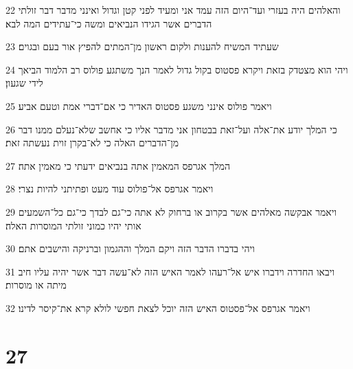 \par 22 והאלהים היה בעזרי ועד־היום הזה עמד אני ומעיד לפני קטן וגדול ואינני מדבר דבר זולתי הדברים אשר הגידו הנביאים ומשה כי־עתידים המה לבא׃
\par 23 שעתיד המשיח להענות ולקום ראשון מן־המתים להפיץ אור בעם ובגוים׃
\par 24 ויהי הוא מצטדק בזאת ויקרא פסטוס בקול גדול לאמר הנך משתגע פולוס רב הלמוד הביאך לידי שגעון׃
\par 25 ויאמר פולוס אינני משגע פסטוס האדיר כי אם־דברי אמת וטעם אביע׃
\par 26 כי המלך יודע את־אלה ועל־זאת בבטחון אני מדבר אליו כי אחשב שלא־נעלם ממנו דבר מן־הדברים האלה כי לא־בקרן זוית נעשתה זאת׃
\par 27 המלך אגרפס המאמין אתה בנביאים ידעתי כי מאמין אתה׃
\par 28 ויאמר אגרפס אל־פולוס עוד מעט ופתיתני להיות נצרי׃
\par 29 ויאמר אבקשה מאלהים אשר בקרוב או ברחוק לא אתה כי־גם לבדך כי־גם כל־השמעים אותי יהיו כמוני זולתי המוסרות האלה׃
\par 30 ויהי בדברו הדבר הזה ויקם המלך וההגמון וברניקה והישבים אתם׃
\par 31 ויבאו החדרה וידברו איש אל־רעהו לאמר האיש הזה לא־עשה דבר אשר יהיה עליו חיב מיתה או מוסרות׃
\par 32 ויאמר אגרפס אל־פסטוס האיש הזה יוכל לצאת חפשי לולא קרא את־קיסר לדינו׃

\chapter{27}

